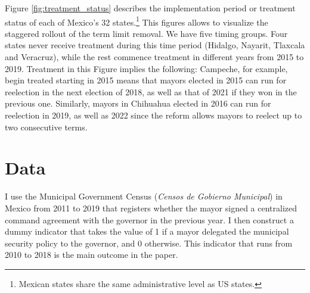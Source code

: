 Figure \ref{fig:treatment_status} describes the implementation period or treatment status of each of Mexico's 32 states.\footnote{Mexican states share the same administrative level as US states.} This figures allows to visualize the staggered rollout of the term limit removal. We have five timing groups. Four states never receive treatment during this time period (Hidalgo, Nayarit, Tlaxcala and Veracruz), while the rest commence treatment in different years from 2015 to 2019. %
Treatment in this Figure implies the following: Campeche, for example, begin treated starting in 2015 means that mayors elected in 2015 can run for reelection in the next election of 2018, as well as that of 2021 if they won in the previous one. Similarly, mayors in Chihuahua elected in 2016 can run for reelection in 2019, as well as 2022 since the reform allows mayors to reelect up to two consecutive terms.  

\section{Data \label{sec:data}}  

I use the Municipal Government Census (\emph{Censos de Gobierno Municipal}) in Mexico from 2011 to 2019 that registers whether the mayor signed a centralized command agreement with the governor in the previous year. I then construct a dummy indicator that takes the value of 1 if a mayor delegated the municipal security policy to the governor, and 0 otherwise. This indicator that runs from 2010 to 2018 is the main outcome in the paper. 

